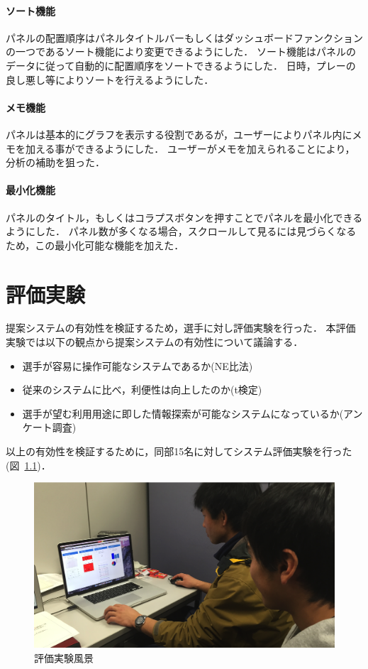 \documentclass[sotsuron]{kuee}
\begin{document}
			\subsubsection{ソート機能}
			パネルの配置順序はパネルタイトルバーもしくはダッシュボードファンクションの一つであるソート機能により変更できるようにした．
			ソート機能はパネルのデータに従って自動的に配置順序をソートできるようにした．
			日時，プレーの良し悪し等によりソートを行えるようにした．
			\subsubsection{メモ機能}
			パネルは基本的にグラフを表示する役割であるが，ユーザーによりパネル内にメモを加える事ができるようにした．
			ユーザーがメモを加えられることにより，分析の補助を狙った．
			\subsubsection{最小化機能}
			パネルのタイトル，もしくはコラプスボタンを押すことでパネルを最小化できるようにした．
			パネル数が多くなる場合，スクロールして見るには見づらくなるため，この最小化可能な機能を加えた．

\chapter{評価実験}
	提案システムの有効性を検証するため，選手に対し評価実験を行った．
	本評価実験では以下の観点から提案システムの有効性について議論する．
	\begin{itemize}
		\item 選手が容易に操作可能なシステムであるか(NE比法)
		\item 従来のシステムに比べ，利便性は向上したのか(t検定)
		\item 選手が望む利用用途に即した情報探索が可能なシステムになっているか(アンケート調査)
	\end{itemize}
	以上の有効性を検証するために，同部15名に対してシステム評価実験を行った(図~\ref{fig:experi})．
		\begin{figure}
			\begin{center}
				\includegraphics[width=\linewidth]{./png/experience.png}
			\end{center}
			\caption{評価実験風景}
	  		\label{fig:experi}
		\end{figure}
\end{document}
